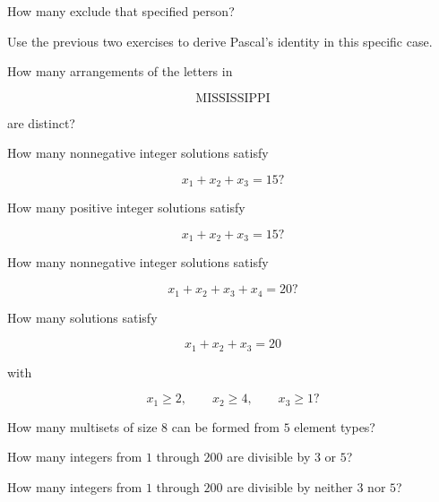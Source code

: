 \begin{exercise}[2]
How many exclude that specified person?
\end{exercise}

\begin{exercise}[2]
Use the previous two exercises to derive Pascal's identity in this
specific case.
\end{exercise}

\begin{exercise}[2]
How many arrangements of the letters in

\[
\text{MISSISSIPPI}
\]

are distinct?
\end{exercise}

\begin{exercise}[2]
How many nonnegative integer solutions satisfy

\[
x_1+x_2+x_3=15?
\]
\end{exercise}

\begin{exercise}[2]
How many positive integer solutions satisfy

\[
x_1+x_2+x_3=15?
\]
\end{exercise}

\begin{exercise}[2]
How many nonnegative integer solutions satisfy

\[
x_1+x_2+x_3+x_4=20?
\]
\end{exercise}

\begin{exercise}[2]
How many solutions satisfy

\[
x_1+x_2+x_3=20
\]

with

\[
x_1\geq2,
\qquad
x_2\geq4,
\qquad
x_3\geq1?
\]
\end{exercise}

\begin{exercise}[2]
How many multisets of size \(8\) can be formed from \(5\) element
types?
\end{exercise}

\begin{exercise}[2]
How many integers from \(1\) through \(200\) are divisible by \(3\) or
\(5\)?
\end{exercise}

\begin{exercise}[2]
How many integers from \(1\) through \(200\) are divisible by neither
\(3\) nor \(5\)?
\end{exercise}


